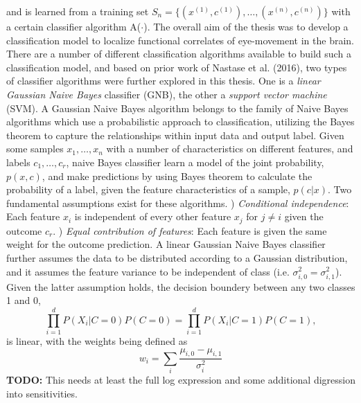 \documentclass[a4paper, 12pt]{scrreprt}
\begin{document}
and is learned from a training set $S_n =\{(x^{(1)}, c^{(1)}), \ldots, (x^{(n)}, c^{(n)}) \}$ with a certain classifier algorithm A($\cdot$).
\newline
The overall aim of the thesis was to develop a classification model to localize functional correlates of eye-movement in the brain. There are a number of different classification algorithms available to build such a classification model, and based on prior work of Nastase et al. (2016), two types of classifier algorithms were further explored in this thesis. One is a \textit{linear Gaussian Naive Bayes} classifier (GNB), the other a \textit{support vector machine} (SVM). \newline
A Gaussian Naive Bayes algorithm belongs to the family of Naive Bayes algorithms which use a probabilistic approach to classification, utilizing the Bayes theorem to capture the relationships within input data and output label. Given some samples $x_1, \ldots, x_n$ with a number of characteristics on different features, and labels $c_1, \ldots, c_r$, naive Bayes classifier learn a model of the joint probability, $p(x, c)$, and make predictions by using Bayes theorem to calculate the probability of a label, given the feature characteristics of a sample, $p(c|x)$. Two fundamental assumptions exist for these algorithms. ) \textit{Conditional independence}: Each feature $x_i$ is independent of every other feature $x_j$ for $j \neq i$ given the outcome $c_r$. ) \textit{Equal contribution of features}:  Each feature is given the same weight for the outcome prediction. \newline A linear Gaussian Naive Bayes classifier further assumes the data to be distributed according to a Gaussian distribution, and it assumes the feature variance to be independent of class (i.e. $\sigma_{i, 0}^2 = \sigma_{i, 1}^2$). Given the latter assumption holds, the decision boundery between any two classes 1 and 0,
\begin{equation}
\prod_{i=1}^{d} P(X_i |C = 0)P(C=0) = \prod_{i=1}^{d} P(X_i |C = 1)P(C=1),
\end{equation}
is linear, with the weights being defined as
\begin{equation}
w_i = \sum_{i}\frac{\mu_{i, 0}-\mu_{i, 1}}{\sigma_{i}^{2}}
\end{equation}
\textbf{TODO:} This needs at least the full log expression and some additional digression into sensitivities.\newline
\end{document}
